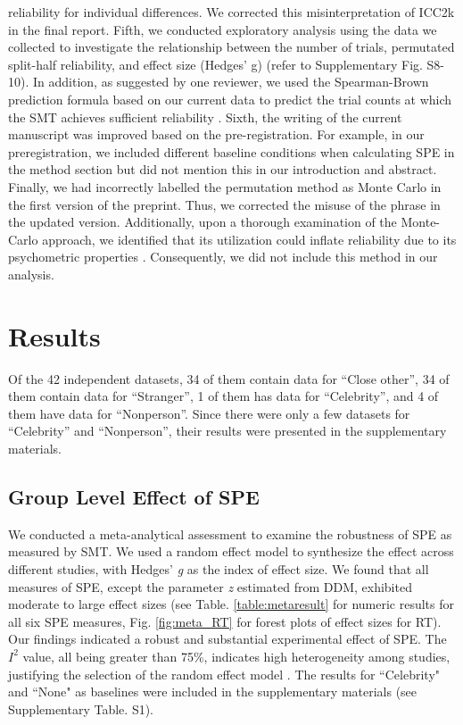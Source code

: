 \documentclass[sn-apa]{sn-jnl}%
\theoremstyle{thmstyleone}%
\theoremstyle{thmstyletwo}%
\theoremstyle{thmstylethree}%
\begin{document}
reliability for individual differences. We corrected this misinterpretation of ICC2k in the final report. Fifth, we conducted exploratory analysis using the data we collected to investigate the relationship between the number of trials, permutated split-half reliability, and effect size (Hedges’ g) (refer to Supplementary Fig. S8-10). In addition, as suggested by one reviewer, we used the Spearman-Brown prediction formula based on our current data to predict the trial counts at which the SMT achieves sufficient reliability \parencite{pronk2023can}. Sixth, the writing of the current manuscript was improved based on the pre-registration. For example, in our preregistration, we included different baseline conditions when calculating SPE in the method section but did not mention this in our introduction and abstract. Finally, we had incorrectly labelled the permutation method as Monte Carlo in the first version of the preprint. Thus, we corrected the misuse of the phrase in the updated version. Additionally, upon a thorough examination of the Monte-Carlo approach, we identified that its utilization could inflate reliability due to its psychometric properties \parencite{kahveci2022reliability}. Consequently, we did not include this method in our analysis. 

\section{Results}\label{sec4}

Of the 42 independent datasets, 34 of them contain data for ``Close other”, 34 of them contain data for ``Stranger”, 1 of them has data for ``Celebrity”, and 4 of them have data for ``Nonperson”. Since there were only a few datasets for ``Celebrity” and ``Nonperson”, their results were presented in the supplementary materials. 

\subsection{Group Level Effect of SPE}\label{subsec:groupeff}

We conducted a meta-analytical assessment to examine the robustness of SPE as measured by SMT. We used a random effect model to synthesize the effect across different studies, with Hedges’ \textit{g} as the index of effect size. We found that all measures of SPE, except the parameter \textit{z} estimated from DDM, exhibited moderate to large effect sizes (see Table. \ref{table:metaresult} for numeric results for all six SPE measures, Fig. \ref{fig:meta_RT} for forest plots of effect sizes for RT). Our findings indicated a robust and substantial experimental effect of SPE. The $I^{2}$ value, all being greater than 75\%, indicates high heterogeneity among studies, justifying the selection of the random effect model \parencite{borenstein2021introduction}.  The results for ``Celebrity" and ``None" as baselines were included in the supplementary materials (see Supplementary Table. S1). 
\end{document}
